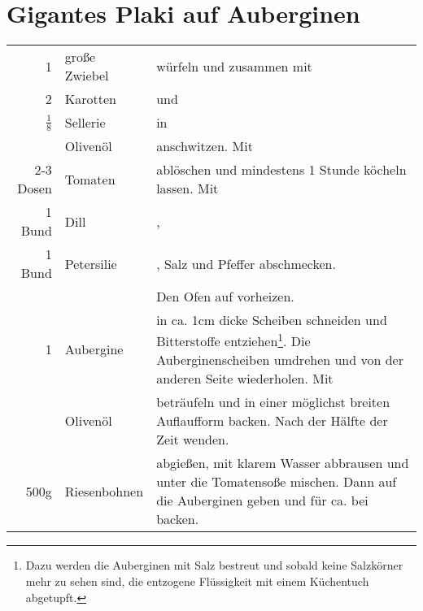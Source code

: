 \section{Gigantes Plaki auf Auberginen}
\begin{longtable}{r l L{16.4cm} }
	1				&	große Zwiebel	&	würfeln und zusammen mit	\\
	2				&	Karotten		&	und	\\
	$\frac{1}{8}$	&	Sellerie		&	in \\
					&	Olivenöl		&	anschwitzen. Mit	\\
	2-3 Dosen		&	Tomaten			&	ablöschen und mindestens 1 Stunde köcheln lassen.	Mit\\
	1 Bund			&	Dill			&	, \\
	1 Bund			&	Petersilie		&	, Salz und Pfeffer abschmecken. \\
					&					&	Den Ofen auf  vorheizen. \\
	1				&	Aubergine		&	in ca. 1cm dicke Scheiben schneiden und Bitterstoffe entziehen\footnote{Dazu werden die Auberginen mit Salz bestreut und sobald keine Salzkörner mehr zu sehen sind, die entzogene Flüssigkeit mit einem Küchentuch abgetupft.}.
											Die Auberginenscheiben umdrehen und von der anderen Seite wiederholen. Mit\\
					&	Olivenöl		&	beträufeln und in einer möglichst breiten Auflaufform  backen.
											Nach der Hälfte der Zeit wenden.	\\
	500g			&	Riesenbohnen	&	abgießen, mit klarem Wasser abbrausen und unter die Tomatensoße mischen.
														Dann auf die Auberginen geben und für ca.  bei  backen.	\\
\end{longtable}